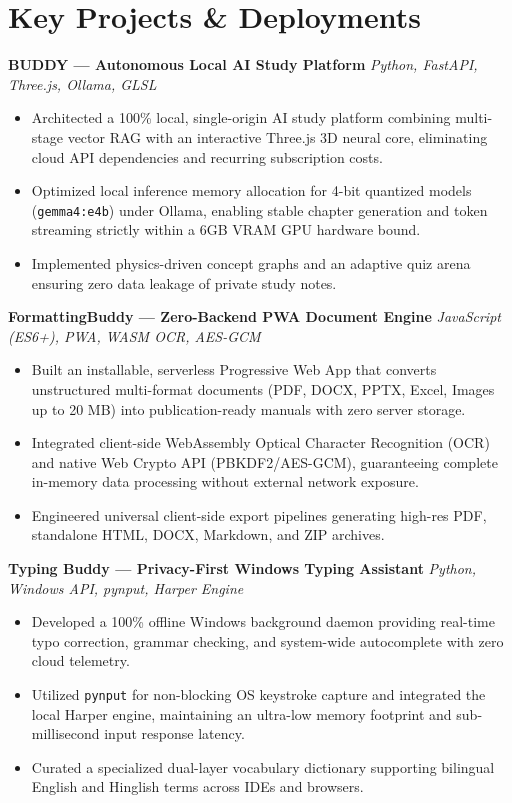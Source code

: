 \documentclass[10pt,a4paper]{article}
\begin{document}
\section{Key Projects \& Deployments}

\textbf{BUDDY --- Autonomous Local AI Study Platform} \hfill \textit{Python, FastAPI, Three.js, Ollama, GLSL}\\
\begin{itemize}
    \item Architected a 100\% local, single-origin AI study platform combining multi-stage vector RAG with an interactive Three.js 3D neural core, eliminating cloud API dependencies and recurring subscription costs.
    \item Optimized local inference memory allocation for 4-bit quantized models (\texttt{gemma4:e4b}) under Ollama, enabling stable chapter generation and token streaming strictly within a 6GB VRAM GPU hardware bound.
    \item Implemented physics-driven concept graphs and an adaptive quiz arena ensuring zero data leakage of private study notes.
\end{itemize}

\vspace{0.3em}
\textbf{FormattingBuddy --- Zero-Backend PWA Document Engine} \hfill \textit{JavaScript (ES6+), PWA, WASM OCR, AES-GCM}\\
\begin{itemize}
    \item Built an installable, serverless Progressive Web App that converts unstructured multi-format documents (PDF, DOCX, PPTX, Excel, Images up to 20 MB) into publication-ready manuals with zero server storage.
    \item Integrated client-side WebAssembly Optical Character Recognition (OCR) and native Web Crypto API (PBKDF2/AES-GCM), guaranteeing complete in-memory data processing without external network exposure.
    \item Engineered universal client-side export pipelines generating high-res PDF, standalone HTML, DOCX, Markdown, and ZIP archives.
\end{itemize}

\vspace{0.3em}
\textbf{Typing Buddy --- Privacy-First Windows Typing Assistant} \hfill \textit{Python, Windows API, pynput, Harper Engine}\\
\begin{itemize}
    \item Developed a 100\% offline Windows background daemon providing real-time typo correction, grammar checking, and system-wide autocomplete with zero cloud telemetry.
    \item Utilized \texttt{pynput} for non-blocking OS keystroke capture and integrated the local Harper engine, maintaining an ultra-low memory footprint and sub-millisecond input response latency.
    \item Curated a specialized dual-layer vocabulary dictionary supporting bilingual English and Hinglish terms across IDEs and browsers.
\end{itemize}
\end{document}
